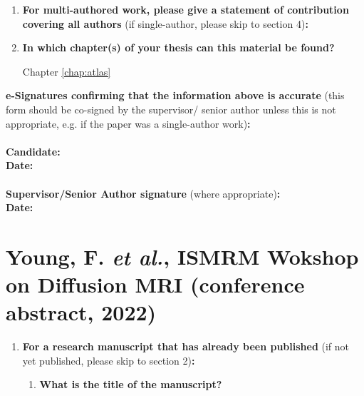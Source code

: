 {\begin{enumerate}[leftmargin=*,label={\bfseries\arabic*.}]
\item \textbf{For multi-authored work, please give a statement of contribution covering all authors} (if single-author, please skip to section 4)\textbf{:}
\item \textbf{In which chapter(s) of your thesis can this material be found?}

Chapter \ref{chap:atlas}
\end{enumerate}

\textbf{e-Signatures confirming that the information above is accurate}
(this form should be co-signed by the supervisor/ senior author unless this is not appropriate, e.g. if the paper was a single-author work)\textbf{:}\\
\textbf{}\\
\textbf{Candidate:}\\
\textbf{Date:}\\
\textbf{}\\
\textbf{Supervisor/Senior Author signature} (where appropriate)\textbf{:}\\
\textbf{Date:}
%

\section*{Young, F. \textit{et al.}, ISMRM Wokshop on Diffusion MRI (conference abstract, 2022)}
\begin{enumerate}[leftmargin=*,label={\bfseries\arabic*.}]\itemsep0em
	\item \textbf{For a research manuscript that has already been published} (if not yet published, please skip to section 2)\textbf{:}
	\begin{enumerate}[label={\alph*)}]\itemsep0em
	\item \textbf{What is the title of the manuscript?}


\end{enumerate}
\end{enumerate}}
